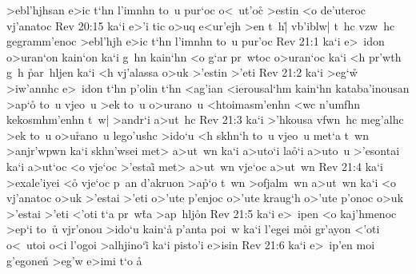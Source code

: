 >ebl'hjhsan
e>ic
t`hn
l'imnhn
to~u
pur`oc
o<~ut'oc\r{}
>estin
<o
de'uteroc
vj'anatoc\bibvsend
\vs Rev 20:15
ka`i
e>'i
tic
o>uq
e<ur'ejh
>en
t~h|\r{}
vb'iblw|
t~hc
vzw~hc
gegramm'enoc
>ebl'hjh
e>ic
t`hn
l'imnhn
to~u
pur'oc\bibvsend
\vs Rev 21:1
ka`i
e>~idon
o>uran`on
kain`on
ka`i
g~hn
kain`hn
<o
g`ar
pr~wtoc
o>uran`oc
ka`i
<h
pr'wth
g~h
\r{p}ar~hljen
ka`i
<h
vj'alassa
o>uk
>'estin
>'eti\bibvsend
\vs Rev 21:2
ka`i
>eg`w\r{}
>iw'annhc
e>~idon
t`hn
p'olin
t`hn
<ag'ian
<ierousal`hm
kain`hn
kataba'inousan
>ap`o\r{}
to~u
vjeo~u
>ek
to~u
o>urano~u
<htoimasm'enhn
<wc
n'umfhn
kekosmhm'enhn
t~w|
>andr`i
a>ut~hc\bibvsend
\vs Rev 21:3
ka`i
>'hkousa
vfwn~hc
meg'alhc
>ek
to~u
o>u\r{r}ano~u
lego'ushc
>ido`u
<h
skhn`h
to~u
vjeo~u
met`a
t~wn
>anjr'wpwn
ka`i
skhn'wsei
met>
a>ut~wn
ka`i
a>uto`i
la\r{o}`i
a>uto~u
>'esontai
ka`i
a>ut`oc
<o
vje`oc
>'estai\r{}
met>
a>ut~wn
vje`oc
a>ut~wn\bibvsend
\vs Rev 21:4
ka`i
>exale'iyei
<o\r{}
vje`oc
p~an
d'akruon
>a\r{p}`o
t~wn
>ofjalm~wn
a>ut~wn
ka`i
<o
vj'anatoc
o>uk
>'estai
>'eti
o>'ute
p'enjoc
o>'ute
kraug`h
o>'ute
p'onoc
o>uk
>'estai
>'eti
<'oti
t`a
pr~w\r{t}a
>ap~hlj\r{o}n\bibvsend
{}
\vs Rev 21:5
ka`i
e>~ipen
<o
kaj'hmenoc
>ep`i
to~u\r{}
vjr'onou
>ido`u
kain`a\r{}
p'anta
poi~w
ka`i
l'egei
m\r{o}i
gr'ayon
<'oti
o<~utoi
o<i
l'ogoi
>alhjino`i\r{}
ka`i
pisto'i
e>isin\bibvsend
\vs Rev 21:6
ka`i
e>~ip'en
moi
g'egonen\r{}
>eg'w
e>imi
t`o
\r{a}
